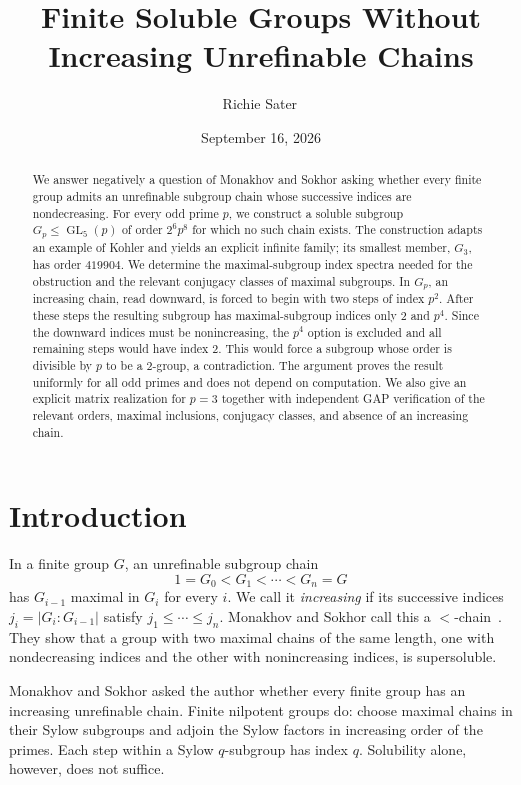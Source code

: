 \documentclass[11pt]{amsart}
\title[Increasing Unrefinable Chains]{Finite Soluble Groups Without\\
Increasing Unrefinable Chains}
\author[Richie Sater]{Richie Sater\,\orcidlink{0009-0007-9051-8207}}
\date{September 16, 2026}
\begin{document}
\begin{abstract}
We answer negatively a question of Monakhov and Sokhor asking whether every
finite group admits an unrefinable subgroup chain whose successive indices
are nondecreasing. For every odd prime $p$, we construct a soluble subgroup
$G_p\leq\operatorname{GL}_5(p)$ of order $2^6p^8$ for which no such chain
exists. The construction adapts an example of Kohler and yields an explicit
infinite family; its smallest member, $G_3$, has order $419904$. We determine
the maximal-subgroup index spectra needed for the obstruction and the
relevant conjugacy classes of maximal subgroups. In $G_p$, an increasing
chain, read downward, is forced to begin with two steps of index $p^2$.
After these steps the resulting subgroup has maximal-subgroup indices only
$2$ and $p^4$. Since the downward indices must be nonincreasing, the
$p^4$ option is excluded and all remaining steps would have index $2$.
This would force a subgroup whose order is divisible by $p$ to be a
$2$-group, a contradiction. The argument proves the result uniformly for
all odd primes and does not depend on computation. We also give an explicit
matrix realization for $p=3$ together with independent GAP verification of
the relevant orders, maximal inclusions, conjugacy classes, and absence of
an increasing chain.
\end{abstract}
\maketitle

\section{Introduction}

In a finite group $G$, an unrefinable subgroup chain
\[
  1=G_0<G_1<\cdots<G_n=G
\]
has $G_{i-1}$ maximal in $G_i$ for every $i$. We call it \emph{increasing}
if its successive indices $j_i=\lvert G_i:G_{i-1}\rvert$ satisfy
$j_1\leq\cdots\leq j_n$. Monakhov and Sokhor call this a
$<$-chain~\cite{MS2025}. They show that a group with two maximal chains of
the same length, one with nondecreasing indices and the other with
nonincreasing indices, is supersoluble.

Monakhov and Sokhor asked the author whether every finite group has an
increasing unrefinable chain. Finite nilpotent groups do: choose maximal
chains in their Sylow subgroups and adjoin the Sylow factors in increasing
order of the primes. Each step within a Sylow $q$-subgroup has index $q$.
Solubility alone, however, does not suffice.
\end{document}
